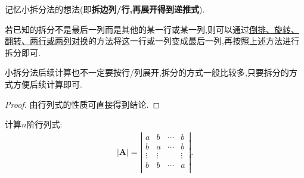 \documentclass[../../main.tex]{subfiles}
\begin{document}
\begin{note}
记忆小拆分法的想法(即\textbf{拆边列/行,再展开得到递推式}).
\end{note}
\begin{remark}
若已知的拆分不是最后一列而是其他的某一行或某一列,则可以通过\hyperref[pro:行列式计算常识]{倒排、旋转、翻转、两行或两列对换}的方法将这一行或一列变成最后一列,再按照上述方法进行拆分即可.

小拆分法后续计算也不一定要按行/列展开,拆分的方式一般比较多,只要拆分的方式方便后续计算即可. 
\end{remark}
\begin{proof}
由行列式的性质可直接得到结论.

\end{proof}

\begin{proposition}\label{大/小拆分法例题1}
计算$n$阶行列式:
\begin{align*}
|\boldsymbol{A}|=\left| \begin{matrix}
a&		b&		\cdots&		b\\
b&		a&		\cdots&		b\\
\vdots&		\vdots&		&		\vdots\\
b&		b&		\cdots&		a\\
\end{matrix} \right|.
\end{align*}
\end{proposition}
\end{document}
